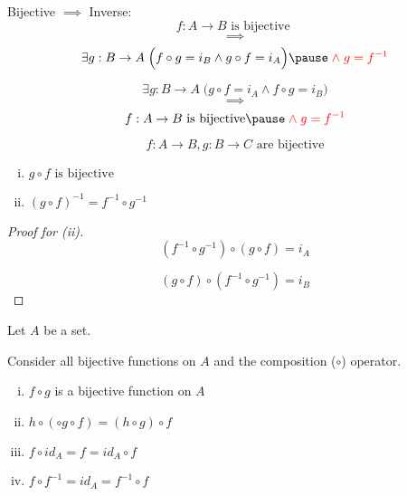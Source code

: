 \begin{frame}{}
  \begin{alertblock}{Bijective $\implies$ Inverse:}
    \[
      f: A \to B \text{ is bijective }
    \]
    \[ 
      \implies 
    \]
    \[
      \exists g: B \to A\; \Big( f \circ g = i_B \land g \circ f = i_A \Big) \pause \red{\;\land\; g = f^{-1}}
    \]
  \end{alertblock}

  \pause
  \vspace{0.50cm}
  \begin{theorem}
    \[
      \exists g: B \to A\; \Big( g \circ f = i_A \land f \circ g = i_B \Big) 
    \]
    \[ 
      \implies 
    \]
    \[
      f: A \to B \text{ is bijective} \pause \red{\;\land\; g = f^{-1}}
    \]
  \end{theorem}
\end{frame}

\begin{frame}{}
  \begin{theorem}
    \[
      f: A \to B, g: B \to C \text{ are bijective}
    \]

    \begin{enumerate}[(i)]
      \item $g \circ f \text{ is bijective}$
      \item $(g \circ f)^{-1} = f^{-1} \circ g^{-1}$
    \end{enumerate}
  \end{theorem}

  \begin{proof}[Proof for (ii)]
    \[
      (f^{-1} \circ g^{-1}) \circ (g \circ f) = i_A
    \]

    \[
      (g \circ f) \circ (f^{-1} \circ g^{-1}) = i_B
    \]
  \end{proof}
\end{frame}

\begin{frame}{}
  \begin{definition}
    Let $A$ be a set.

    Consider all bijective functions on $A$ and the composition ($\circ$) operator.

    \begin{enumerate}[(i)]
      \item $f \circ g$ is a bijective function on $A$
      \item $h \circ (\circ g \circ f) = (h \circ g) \circ f$
      \item $f \circ id_A = f = id_A \circ f$
      \item $f \circ f^{-1} = id_A = f^{-1} \circ f$
    \end{enumerate}
  \end{definition}
\end{frame}
